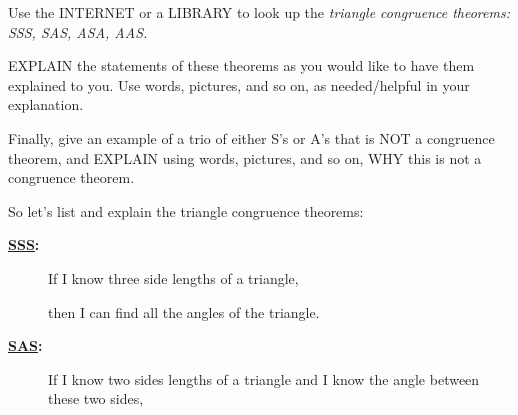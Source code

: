 \documentclass{ximera}
\begin{document}
\begin{question}
  Use the INTERNET or a LIBRARY to look up the \textit{triangle congruence
  theorems: SSS, SAS, ASA, AAS.}


  EXPLAIN the statements of these theorems as you would like to have
  them explained to you. Use words, pictures, and so on, as
  needed/helpful in your explanation.

  Finally, give an example of a trio of either S's or A's that is NOT
  a congruence theorem, and EXPLAIN using words, pictures, and so on,
  WHY this is not a congruence theorem.


  \begin{freeResponse}
    So let's list and explain the triangle congruence theorems:
    \begin{description}
    \item[\wedn\bfseries\underline{SSS}:] If I know three side lengths
      of a triangle,
      \begin{center}
      \end{center}
      then I can find all the angles of the triangle.
    \item[\wedn\bfseries\underline{SAS}:] If I know two sides lengths
      of a triangle and I know the angle between these two sides,
      \begin{center}
\end{center}
\end{description}
\end{freeResponse}
\end{question}
\end{document}
